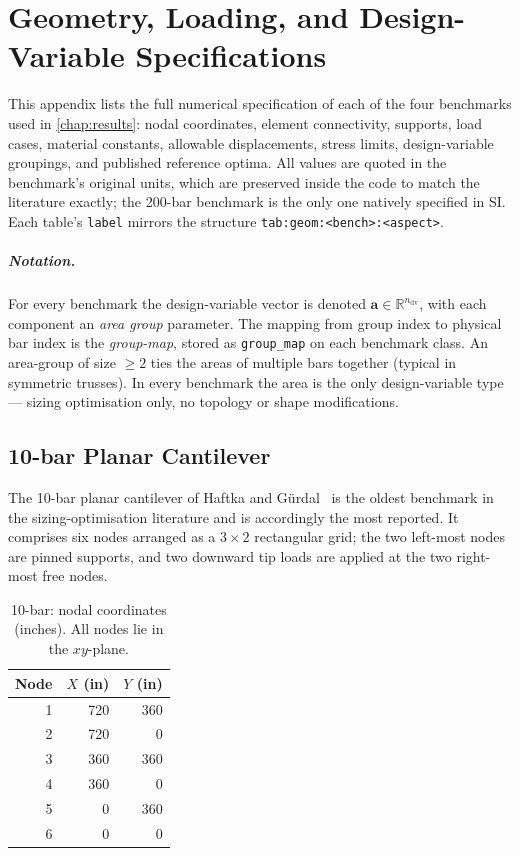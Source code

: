 \chapter{Geometry, Loading, and Design-Variable Specifications}
\label{app:geom}

This appendix lists the full numerical specification of each of
the four benchmarks used in \cref{chap:results}: nodal
coordinates, element connectivity, supports, load cases, material
constants, allowable displacements, stress limits, design-variable
groupings, and published reference optima. All values are quoted
in the benchmark's original units, which are preserved inside the
code to match the literature exactly; the 200-bar benchmark is the
only one natively specified in SI. Each table's \texttt{label}
mirrors the structure \verb|tab:geom:<bench>:<aspect>|.

\paragraph{Notation.} For every benchmark the design-variable
vector is denoted $\mathbf{a}\in\mathbb{R}^{n_{\mathrm{dv}}}$,
with each component an \emph{area group} parameter. The mapping
from group index to physical bar index is the
\emph{group-map}, stored as \texttt{group\_map} on each benchmark
class. An area-group of size $\ge 2$ ties the areas of multiple
bars together (typical in symmetric trusses). In every benchmark
the area is the only design-variable type --- sizing optimisation
only, no topology or shape modifications.

\section{10-bar Planar Cantilever}
\label{app:geom:10bar}

The 10-bar planar cantilever of
Haftka and G\"urdal~\cite{haftka_gurdal1992} is the oldest
benchmark in the sizing-optimisation literature and is
accordingly the most reported. It comprises six nodes arranged
as a $3\times 2$ rectangular grid; the two left-most nodes are
pinned supports, and two downward tip loads are applied at the
two right-most free nodes.

\begin{table}[h]
  \centering
  \small
  \caption{10-bar: nodal coordinates (inches). All nodes lie in
    the $xy$-plane.}
  \label{tab:geom:10bar:nodes}
  \begin{tabular}{rrr}
  \toprule
  Node & $X$ (in) & $Y$ (in) \\
  \midrule
  1 & 720 & 360 \\
  2 & 720 & 0 \\
  3 & 360 & 360 \\
  4 & 360 & 0 \\
  5 & 0   & 360 \\
  6 & 0   & 0   \\
  \bottomrule
  \end{tabular}
\end{table}

